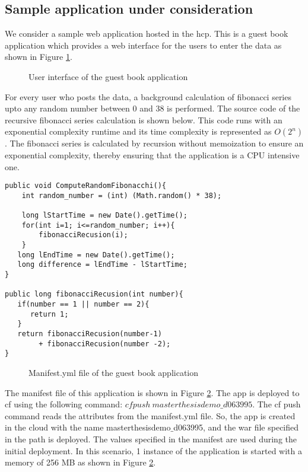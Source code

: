 \documentclass[article,type=msc,colorback,12pt,accentcolor=tud8b,table]{tudthesis}
\begin{document}
	\subsection{Sample application under consideration}
We consider a sample web application hosted in the \gls{hcp}. This is a guest book application which provides a web interface for the users to enter the data as shown in Figure \ref{fig:guestbook_ui}. 
 \begin{figure}[h]
 \begin{center}
  \makebox[\textwidth]{\texttt{[image: E1]}}
\end{center}
\caption{User interface of the guest book application}
\label{fig:guestbook_ui}
\end{figure}
For every user who posts the data, a background calculation of fibonacci series upto any random number between 0 and 38 is performed. The source code of the recursive fibonacci series calculation is shown below. This code runs with an exponential complexity runtime and its time complexity is represented as $O(2^n)$. The fibonacci series is calculated by recursion without memoization to ensure an exponential complexity, thereby ensuring that the application is a CPU intensive one.
 \begin{lstlisting}
public void ComputeRandomFibonacchi(){		
	int random_number = (int) (Math.random() * 38);		
		
	long lStartTime = new Date().getTime();
	for(int i=1; i<=random_number; i++){
		fibonacciRecusion(i);
    }			
   long lEndTime = new Date().getTime();
   long difference = lEndTime - lStartTime;    	
}
		  
public long fibonacciRecusion(int number){
   if(number == 1 || number == 2){
      return 1;
   }
   return fibonacciRecusion(number-1) 
   		+ fibonacciRecusion(number -2); 
}
\end{lstlisting}
 \begin{figure}
 \begin{center}
  \makebox[\textwidth]{\texttt{[image: E2]}}
\end{center}
\caption{Manifest.yml file of the guest book application}
\label{fig:guestbook_manifest}
\end{figure}

The manifest file of this application is shown in Figure \ref{fig:guestbook_manifest}. The app is deployed to \gls{cf} using the following command: $ cf push \: masterthesisdemo\_d063995 $. The cf push command reads the attributes from the manifest.yml file. So, the app is created in the cloud with the name masterthesisdemo$\_$d063995, and the war file specified in the path is deployed. The values specified in the manifest are used during the initial deployment. In this scenario, 1 instance of the application is started with a memory of 256 MB as shown in Figure \ref{fig:guestbook_manifest}.	
	
\end{document}
